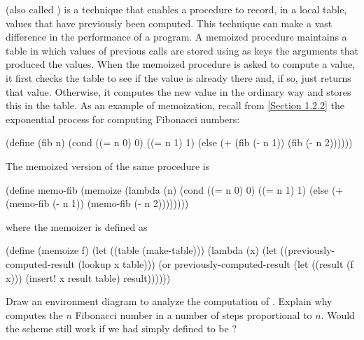 \begin{exercise}
	\label{Exercise 3.27}
	 (also called ) is a technique that enables a procedure to record, in a local table, values that have previously been computed.
	This technique can make a vast difference in the performance of a program.
	A memoized procedure maintains a table in which values of previous calls are stored using as keys the arguments that produced the values.
	When the memoized procedure is asked to compute a value, it first checks the table to see if the value is already there and, if so, just returns that value.
	Otherwise, it computes the new value in the ordinary way and stores this in the table.
	As an example of memoization, recall from \cref{Section 1.2.2} the exponential process for computing Fibonacci numbers:
	\begin{scheme}
	  (define (fib n)
	    (cond ((= n 0) 0)
	          ((= n 1) 1)
	          (else (+ (fib (- n 1)) (fib (- n 2))))))
	\end{scheme}
	The memoized version of the same procedure is
	\begin{scheme}
	  (define memo-fib
	    (memoize
	     (lambda (n)
	       (cond ((= n 0) 0)
	             ((= n 1) 1)
	             (else (+ (memo-fib (- n 1))
	                      (memo-fib (- n 2))))))))
	\end{scheme}
	where the memoizer is defined as
	\begin{scheme}
	  (define (memoize f)
	    (let ((table (make-table)))
	      (lambda (x)
	        (let ((previously-computed-result
	               (lookup x table)))
	          (or previously-computed-result
	              (let ((result (f x)))
	                (insert! x result table)
	                result))))))
	\end{scheme}
	Draw an environment diagram to analyze the computation of .
	Explain why  computes the \( n \) Fibonacci number in a number of steps proportional to \( n \).
	Would the scheme still work if we had simply defined  to be ?
\end{exercise}
